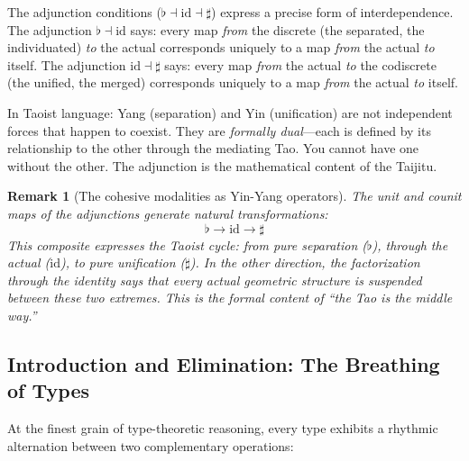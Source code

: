 \documentclass[12pt,a4paper]{article}
\newtheorem{remark}{Remark}[section]
\newcommand{\flatmod}{\flat}
\newcommand{\sharpmod}{\sharp}
\begin{document}
The adjunction conditions ($\flatmod \dashv \mathrm{id} \dashv \sharpmod$) express a precise form of interdependence. The adjunction $\flatmod \dashv \mathrm{id}$ says: every map \emph{from} the discrete (the separated, the individuated) \emph{to} the actual corresponds uniquely to a map \emph{from} the actual \emph{to} itself. The adjunction $\mathrm{id} \dashv \sharpmod$ says: every map \emph{from} the actual \emph{to} the codiscrete (the unified, the merged) corresponds uniquely to a map \emph{from} the actual \emph{to} itself.

In Taoist language: Yang (separation) and Yin (unification) are not independent forces that happen to coexist. They are \emph{formally dual}---each is defined by its relationship to the other through the mediating Tao. You cannot have one without the other. The adjunction is the mathematical content of the Taijitu.

\begin{remark}[The cohesive modalities as Yin-Yang operators]
The unit and counit maps of the adjunctions generate natural transformations:
\[
\flatmod \to \mathrm{id} \to \sharpmod
\]
This composite expresses the Taoist cycle: from pure separation ($\flatmod$), through the actual ($\mathrm{id}$), to pure unification ($\sharpmod$). In the other direction, the factorization through the identity says that every actual geometric structure is \emph{suspended between} these two extremes. This is the formal content of ``the Tao is the middle way.''
\end{remark}


\subsection{Introduction and Elimination: The Breathing of Types}
\label{sec:breathing}

At the finest grain of type-theoretic reasoning, every type exhibits a rhythmic alternation between two complementary operations:
\end{document}
